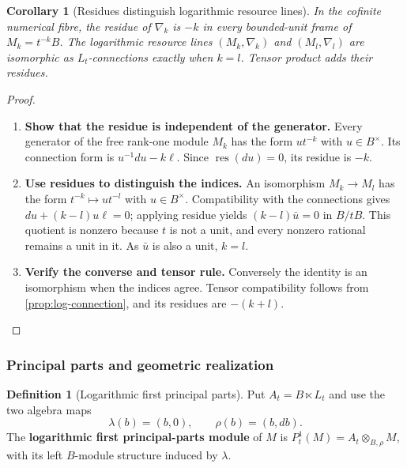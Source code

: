 \documentclass[11pt,a4paper]{article}
\numberwithin{algorithm}{section}
\numberwithin{equation}{section}
\newtheorem{corollary}[corollary]{Corollary}
\theoremstyle{definition}
\newtheorem{definition}[definition]{Definition}
\theoremstyle{remark}
\theoremstyle{plain}
\theoremstyle{definition}
\theoremstyle{plain}
\begin{document}
\begin{corollary}[Residues distinguish logarithmic resource lines]
\label{cor:logarithmic-residue-invariance}
In the cofinite numerical fibre, the residue of $\nabla_k$ is $-k$
in every bounded-unit frame of $M_k=t^{-k}B$. The logarithmic resource
lines $(M_k,\nabla_k)$ and $(M_l,\nabla_l)$ are isomorphic as
$L_t$-connections exactly when $k=l$. Tensor product adds their
residues.
\end{corollary}
\begin{proof}\leavevmode
\begin{enumerate}[leftmargin=*,align=left]
\item \textbf{Show that the residue is independent of the generator.}
Every generator of the free rank-one module $M_k$ has the form
$ut^{-k}$ with $u\in B^\times$. Its connection form is
$u^{-1}du-k\ell$. Since $\operatorname{res}(du)=0$, its residue
is $-k$.

\item \textbf{Use residues to distinguish the indices.}
An isomorphism $M_k\to M_l$ has the form
$t^{-k}\mapsto ut^{-l}$ with $u\in B^\times$.
Compatibility with the connections gives
$du+(k-l)u\ell=0$; applying residue yields
$(k-l)\bar u=0$ in $B/tB$. This quotient is nonzero because $t$
is not a unit, and every nonzero rational remains a unit in it.
As $\bar u$ is also a unit, $k=l$.

\item \textbf{Verify the converse and tensor rule.}
Conversely the identity is an
isomorphism when the indices agree. Tensor compatibility follows
from \cref{prop:log-connection}, and its residues are $-(k+l)$.
\end{enumerate}
\end{proof}


\subsubsection{Principal parts and geometric realization}


\begin{definition}[Logarithmic first principal parts]\label{def:logarithmic-principal-parts}
Put $A_t=B\ltimes L_t$ and use the two algebra maps
\[
 \lambda(b)=(b,0),\qquad \rho(b)=(b,db).
\]
The \textbf{logarithmic first principal-parts module} of $M$ is
$P_t^1(M)=A_t\otimes_{B,\rho}M$, with its left
$B$-module structure induced by $\lambda$.
\end{definition}
\end{document}
